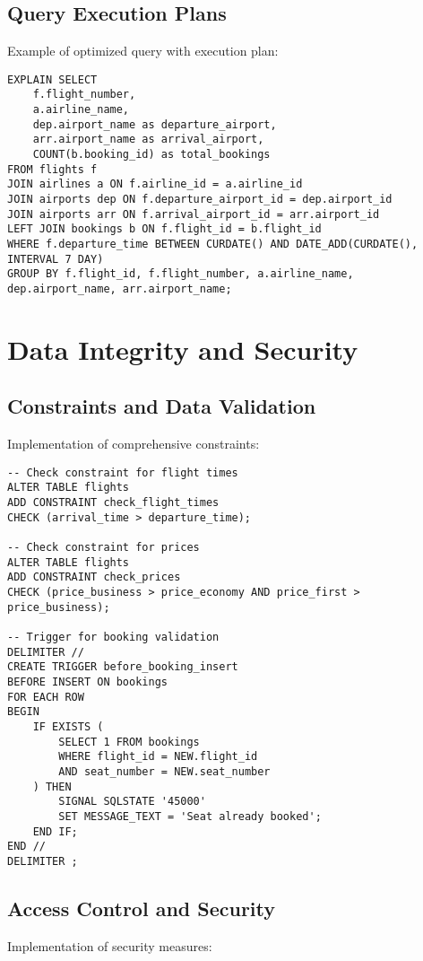 \documentclass[a4paper,12pt]{article}
\begin{document}
\subsection{Query Execution Plans}
Example of optimized query with execution plan:

\begin{lstlisting}[caption=Optimized Query with Execution Plan]
EXPLAIN SELECT 
    f.flight_number,
    a.airline_name,
    dep.airport_name as departure_airport,
    arr.airport_name as arrival_airport,
    COUNT(b.booking_id) as total_bookings
FROM flights f
JOIN airlines a ON f.airline_id = a.airline_id
JOIN airports dep ON f.departure_airport_id = dep.airport_id
JOIN airports arr ON f.arrival_airport_id = arr.airport_id
LEFT JOIN bookings b ON f.flight_id = b.flight_id
WHERE f.departure_time BETWEEN CURDATE() AND DATE_ADD(CURDATE(), INTERVAL 7 DAY)
GROUP BY f.flight_id, f.flight_number, a.airline_name, dep.airport_name, arr.airport_name;
\end{lstlisting}

\section{Data Integrity and Security}
\subsection{Constraints and Data Validation}
Implementation of comprehensive constraints:

\begin{lstlisting}[caption=Data Validation Constraints]
-- Check constraint for flight times
ALTER TABLE flights
ADD CONSTRAINT check_flight_times 
CHECK (arrival_time > departure_time);

-- Check constraint for prices
ALTER TABLE flights
ADD CONSTRAINT check_prices 
CHECK (price_business > price_economy AND price_first > price_business);

-- Trigger for booking validation
DELIMITER //
CREATE TRIGGER before_booking_insert
BEFORE INSERT ON bookings
FOR EACH ROW
BEGIN
    IF EXISTS (
        SELECT 1 FROM bookings 
        WHERE flight_id = NEW.flight_id 
        AND seat_number = NEW.seat_number
    ) THEN
        SIGNAL SQLSTATE '45000' 
        SET MESSAGE_TEXT = 'Seat already booked';
    END IF;
END //
DELIMITER ;
\end{lstlisting}

\subsection{Access Control and Security}
Implementation of security measures:
\end{document}
